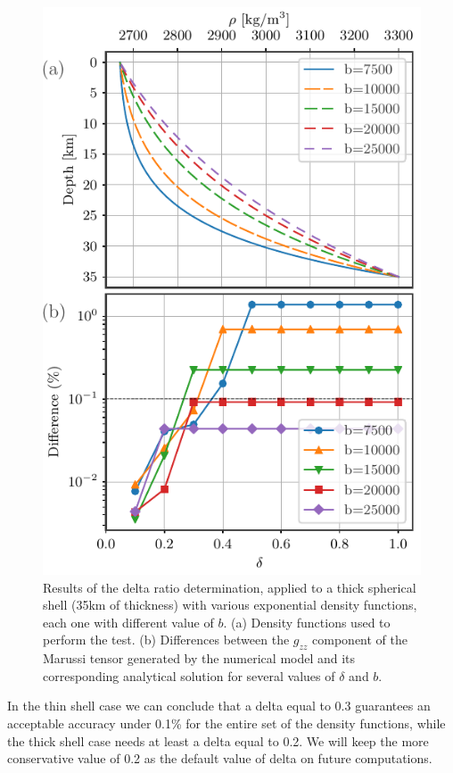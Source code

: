 \documentclass[extra]{gji}
\begin{document}
\begin{figure}
\centering
\includegraphics[width=0.9\linewidth]{figures/exponential-delta-thick.pdf}
\caption{
    Results of the delta ratio determination, applied to a thick spherical shell (35km of thickness) with various exponential density functions, each one with different value of $b$.
    (a) Density functions used to perform the test.
    (b) Differences between the $g_{zz}$ component of the Marussi tensor generated by the numerical model and its corresponding analytical solution for several values of $\delta$ and $b$.}
\label{fig:exponential-delta-thick}
\end{figure}

In the thin shell case we can conclude that a delta equal to 0.3 guarantees an acceptable accuracy under 0.1\% for the entire set of the density functions, while the thick shell case needs at least a delta equal to 0.2.
We will keep the more conservative value of 0.2 as the default value of delta on future computations.
\end{document}
